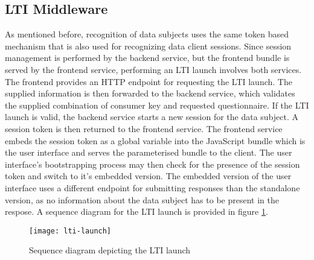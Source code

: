 \subsection{LTI Middleware}
    As mentioned before, recognition of data subjects uses the same token based
    mechanism that is also used for recognizing data client sessions.
    Since session management is performed by the backend service,
    but the frontend bundle is served by the frontend service, performing
    an LTI launch involves both services. The frontend provides an HTTP
    endpoint for requesting the LTI launch. The supplied information
    is then forwarded to the backend service, which validates
    the supplied combination of consumer key and requested questionnaire.
    If the LTI launch is valid, the backend service starts a new session
    for the data subject. A session token is then returned to the frontend
    service. The frontend service embeds the session token as a global
    variable into the JavaScript bundle which is the user interface and
    serves the parameterised bundle to the client.
    The user interface's bootstrapping process may then check for
    the presence of the session token and switch to it's embedded version.
    The embedded version of the user interface uses a different endpoint
    for submitting responses than the standalone version, as no information
    about the data subject has to be present in the respose.
    A sequence diagram for the LTI launch is provided in figure \ref{fig:lti-launch}.

    \begin{figure}
        \centering
        \texttt{[image: lti-launch]}
        \caption{Sequence diagram depicting the LTI launch}
        \label{fig:lti-launch}
    \end{figure}
    
